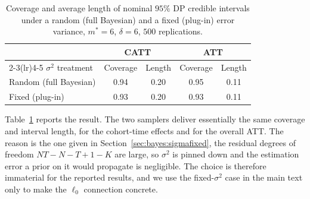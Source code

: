 \documentclass[margin=5in, 12pt]{article}
\newcommand{\1}{\mathbbm{1}}
\begin{document}
\begin{table}[H]
  \centering
  \caption{Coverage and average length of nominal $95\%$ DP credible intervals
  under a random (full Bayesian) and a fixed (plug-in) error variance,
  $m^{\ast}=6$, $\delta=6$, $500$ replications.}
  \label{tab:sigma}
  \small
  \begin{tabular}{lcccc}
    \toprule
    & \multicolumn{2}{c}{CATT} & \multicolumn{2}{c}{ATT} \\
    \cmidrule(lr){2-3}\cmidrule(lr){4-5}
    $\sigma^{2}$ treatment & Coverage & Length & Coverage & Length \\
    \midrule
    Random (full Bayesian) & 0.94 & 0.20 & 0.95 & 0.11 \\
    Fixed (plug-in)        & 0.93 & 0.20 & 0.93 & 0.11 \\
    \bottomrule
  \end{tabular}
\end{table}

Table~\ref{tab:sigma} reports the result. The two samplers deliver essentially the same coverage and interval length, for the cohort-time effects and for the overall ATT. The reason is the one given in Section~\ref{sec:bayes:sigmafixed}, the residual degrees of freedom $NT - N - T + 1 - K$ are large, so $\sigma^{2}$ is pinned down and the estimation error a prior on it would propagate is negligible. The choice is therefore immaterial for the reported results, and we use the fixed-$\sigma^{2}$ case in the main text only to make the $\ell_0$ connection concrete.
\end{document}
